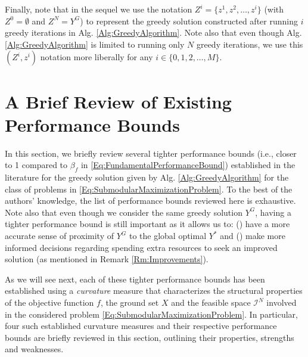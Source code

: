 \documentclass[conference]{IEEEtran}
\begin{document}
Finally, note that in the sequel we use the notation $Z^i = \{z^1,z^2,\ldots,z^i\}$ (with $Z^0=\emptyset$ and $Z^N=Y^G$) to represent the greedy solution constructed after running $i$ greedy iterations in Alg. \ref{Alg:GreedyAlgorithm}. Note also that even though Alg. \ref{Alg:GreedyAlgorithm} is limited to running only $N$ greedy iterations, we use this $(Z^i,z^i)$ notation more liberally for any $i\in\{0,1,2,\ldots,M\}$. 



\section{A Brief Review of Existing Performance Bounds}
\label{Sec:LiteratureReview}



In this section, we briefly review several tighter performance bounds (i.e., closer to 1 compared to $\beta_f$ in \eqref{Eq:FundamentalPerformanceBound}) established in the literature for the greedy solution given by Alg. \ref{Alg:GreedyAlgorithm} for the class of problems in \eqref{Eq:SubmodularMaximizationProblem}. To the best of the authors' knowledge, the list of performance bounds reviewed here is exhaustive. Note also that even though we consider the same greedy solution $Y^G$, having a tighter performance bound is still important as it allows us to: () have a more accurate sense of proximity of $Y^G$ to the global optimal $Y^*$ and () make more informed decisions regarding spending extra resources to seek an improved solution (as mentioned in Remark \ref{Rm:Improvements}). 



As we will see next, each of these tighter performance bounds has been established using a \emph{curvature} measure that characterizes the structural properties of the objective function $f$, the ground set $X$ and the feasible space $\mathcal{I}^N$ involved in the considered problem \eqref{Eq:SubmodularMaximizationProblem}. In particular, four such established curvature measures and their respective performance bounds are briefly reviewed in this section, outlining their properties, strengths and weaknesses. 


\end{document}
